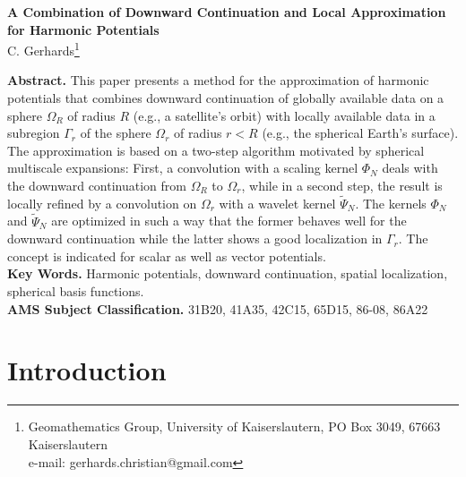 \documentclass[a4paper, 10pt]{article}
\numberwithin{equation}{section}
\theoremstyle{definition}
\begin{document}
\begin{center}
\LARGE{\textbf{A Combination of Downward Continuation and Local Approximation for Harmonic Potentials}}
\\[3ex]\normalsize C. Gerhards\footnote{Geomathematics Group, University of Kaiserslautern, PO Box 3049, 67663 Kaiserslautern
\\e-mail: gerhards.christian@gmail.com}
\\[5ex]
\end{center}

\textbf{Abstract.}
This paper presents a method for the approximation of harmonic potentials that combines downward continuation of globally available data on a sphere $\Omega_R$ of radius $R$ (e.g., a satellite's orbit) with locally available data in a subregion $\Gamma_r$ of the sphere $\Omega_r$ of radius $r<R$ (e.g., the spherical Earth's surface). The approximation is based on a two-step algorithm motivated by spherical multiscale expansions: First, a convolution with a scaling kernel $\Phi_N$ deals with the downward continuation from $\Omega_R$ to $\Omega_r$, while in a second step, the result is locally refined by a convolution on $\Omega_r$ with a wavelet kernel $\tilde{\Psi}_N$. The kernels $\Phi_N$ and $\tilde{\Psi}_N$ are optimized in such a way that the former behaves well for the downward continuation while the latter shows a good localization in $\Gamma_r$. %
The concept is indicated for scalar as well as vector potentials. 
\\

\textbf{Key Words.} Harmonic potentials,  downward continuation, spatial localization, spherical basis functions.
\\

\textbf{AMS Subject Classification.} 31B20, 41A35, 42C15, 65D15, 86-08, 86A22

\section{Introduction}%
\end{document}
